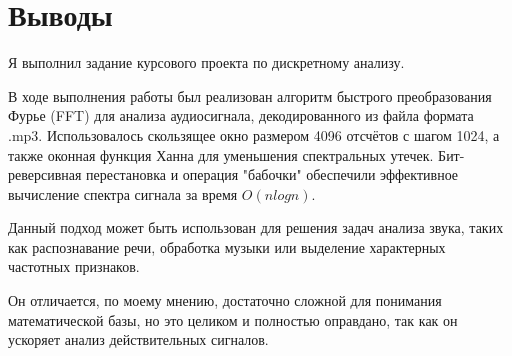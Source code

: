  
\section{Выводы}
Я выполнил задание курсового проекта по дискретному анализу.

В ходе выполнения работы был реализован алгоритм быстрого преобразования Фурье (FFT) для анализа аудиосигнала, декодированного из файла формата .mp3. Использовалось скользящее окно размером 4096 отсчётов с шагом 1024, а также оконная функция Ханна для уменьшения спектральных утечек. Бит-реверсивная перестановка и операция "бабочки" обеспечили эффективное вычисление спектра сигнала за время $O(nlogn)$.

Данный подход может быть использован для решения задач анализа звука, таких как распознавание речи, обработка музыки или выделение характерных частотных признаков.

Он отличается, по моему мнению, достаточно сложной для понимания математической базы, но это целиком и полностью оправдано, так как он ускоряет анализ действительных сигналов.
\pagebreak
